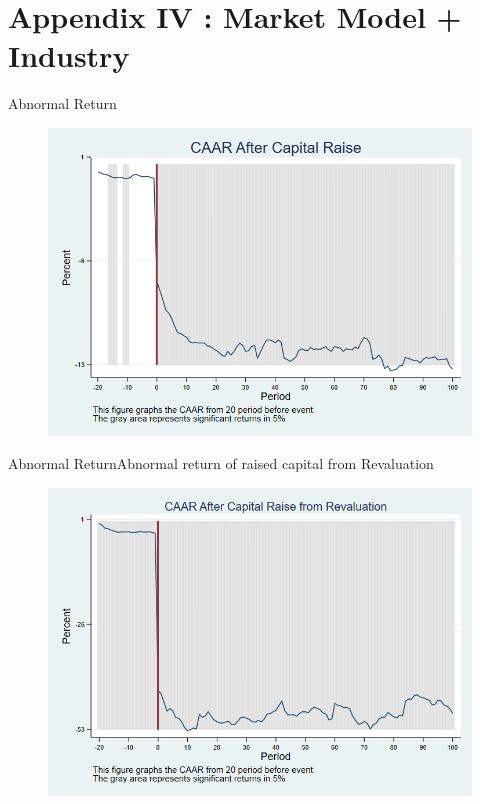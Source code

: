 \documentclass{beamer}
\begin{document}
\section{Appendix IV : Market Model + Industry }


\begin{frame}{Abnormal Return}
	\label{car_marketmodel_industry}
	\begin{figure}
		\centering
		\includegraphics[width=0.7\linewidth]{Output/car_marketmodel_industry.png}
		\label{fig:car_marketmodel_industry}
	\end{figure}
\end{frame}

\begin{frame}{Abnormal Return}{Abnormal return of raised capital from Revaluation}
	\label{car_marketmodel_industryRevaluation}
	\begin{figure}
		\centering
		\includegraphics[width=0.65\linewidth]{Output/car_marketmodel_industryRevaluation.png}
		\label{fig:car_marketmodel_industryRevaluation}
	\end{figure}
\end{frame}
\end{document}
